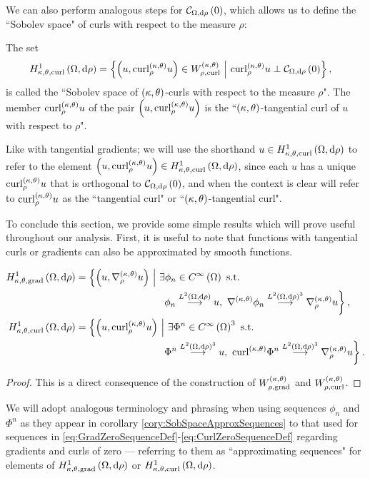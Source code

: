 We can also perform analogous steps for $\mathcal{C}_{ \Omega, \mathrm{d}\rho}\left( 0 \right)$, which allows us to define the ``Sobolev space" of curls with respect to the measure $\rho$:
\begin{definition} \label{def:CurlSobSpace}
	The set
	\begin{align*}
		H^1_{\kappa,\theta,\mathrm{curl}}\left( \Omega, \mathrm{d}\rho \right) &= \left\{  \left( u, \mathrm{curl}_{\rho}^{\left( \kappa, \theta \right)}u \right)\in W^{\left( \kappa, \theta \right)}_{\rho,\mathrm{curl}} \ \middle\vert \  \mathrm{curl}_{\rho}^{\left( \kappa, \theta \right)}u \perp \mathcal{C}_{ \Omega, \mathrm{d}\rho}\left( 0 \right)  \right\},
	\end{align*}
	is called the ``Sobolev space of $\left( \kappa, \theta \right)$-curls with respect to the measure $\rho$".
	The member $\mathrm{curl}_{\rho}^{\left( \kappa, \theta \right)}u$ of the pair $\left( u, \mathrm{curl}_{\rho}^{\left( \kappa, \theta \right)}u \right)$ is the ``$\left( \kappa, \theta \right)$-tangential curl of $u$ with respect to $\rho$".
\end{definition}
Like with tangential gradients; we will use the shorthand $u\in H^1_{\kappa,\theta,\mathrm{curl}}\left( \Omega, \mathrm{d}\rho \right)$ to refer to the element $\left( u, \mathrm{curl}_{\rho}^{\left( \kappa, \theta \right)}u \right)\in H^1_{\kappa,\theta,\mathrm{curl}}\left( \Omega, \mathrm{d}\rho \right)$, since each $u$ has a unique $\mathrm{curl}_{\rho}^{\left( \kappa, \theta \right)}u$ that is orthogonal to $\mathcal{C}_{ \Omega, \mathrm{d}\rho}\left( 0 \right)$, and when the context is clear will refer to $\mathrm{curl}_{\rho}^{\left( \kappa, \theta \right)}u$ as the ``tangential curl" or ``$\left( \kappa, \theta \right)$-tangential curl".

To conclude this section, we provide some simple results which will prove useful throughout our analysis.
First, it is useful to note that functions with tangential curls or gradients can also be approximated by smooth functions.
\begin{cory} \label{cory:SobSpaceApproxSequences}
	\begin{align*}
		\ktgradSob{\ddom}{\rho} &= \clbracs{ \bracs{u, \ktgrad_{\rho}u} \setVert \exists\phi_n\in\smooth{\ddom} \text{ s.t. } \right. \\ 
		&\hspace{0.25\textwidth} \left. \phi_n\lconv{\ltwo{\ddom}{\rho}}u, \ \ktgrad\phi_n\lconv{\ltwo{\ddom}{\rho}^3}\ktgrad_{\rho}u }, \\
		\ktcurlSob{\ddom}{\rho} &= \clbracs{ \bracs{u, \ktcurl{\rho}u} \setVert \exists\Phi^n\in\smooth{\ddom}^3 \text{ s.t. } \right. \\
		&\hspace{0.25\textwidth} \left. \Phi^n\lconv{\ltwo{\ddom}{\rho}^3}u, \ \ktcurl{}\Phi^n\lconv{\ltwo{\ddom}{\rho}^3}\ktgrad_{\rho}u }.
	\end{align*}
\end{cory}
\begin{proof}
	This is a direct consequence of the construction of $W^{\left( \kappa, \theta \right)}_{\rho,\mathrm{grad}}$ and $W^{\left( \kappa, \theta \right)}_{\rho,\mathrm{curl}}$.
\end{proof}
We will adopt analogous terminology and phrasing when using sequences $\phi_n$ and $\Phi^n$ as they appear in corollary \ref{cory:SobSpaceApproxSequences} to that used for sequences in \eqref{eq:GradZeroSequenceDef}-\eqref{eq:CurlZeroSequenceDef} regarding gradients and curls of zero --- referring to them as ``approximating sequences" for elements of $H^1_{\kappa,\theta,\mathrm{grad}}\left( \Omega, \mathrm{d}\rho \right)$ or $H^1_{\kappa,\theta,\mathrm{curl}}\left( \Omega, \mathrm{d}\rho \right)$.

